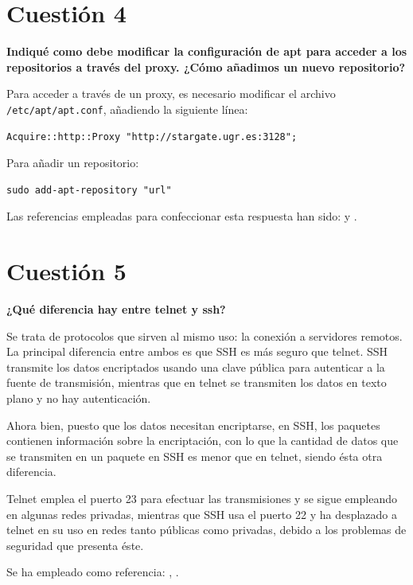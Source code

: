 \documentclass[a4paper,11pt]{article}
\newenvironment{answer}{%
\begin{list}{}{%
}%
\item[]}{\end{list}}
\begin{document}
\section{Cuestión 4}
\textbf{Indiqué como debe modificar la configuración de apt para acceder a los repositorios a través del proxy. ¿Cómo 
añadimos un nuevo repositorio?}
\begin{answer}
  Para acceder a través de un proxy, es necesario modificar el archivo \texttt{/etc/apt/apt.conf},
  añadiendo la siguiente línea:
  \begin{lstlisting}[style=BashInputStyle]
  Acquire::http::Proxy "http://stargate.ugr.es:3128";
  \end{lstlisting}
  Para añadir un repositorio:
  \begin{lstlisting}[style=BashInputStyle]
  sudo add-apt-repository "url"
  \end{lstlisting}
  
  Las referencias empleadas para confeccionar esta respuesta han sido: \cite{aptproxy} y
  \cite{aptrepo}.
\end{answer}

\section{Cuestión 5}
\textbf{¿Qué diferencia hay entre telnet y ssh?}
\begin{answer}
  Se trata de protocolos que sirven al mismo uso: la conexión a servidores remotos.
  La principal diferencia entre ambos es que SSH es más seguro que telnet. SSH transmite
  los datos encriptados usando una clave pública para autenticar a la fuente de transmisión, 
  mientras que en telnet se transmiten los datos en texto plano y no hay autenticación.
  
  Ahora bien, puesto que los datos necesitan encriptarse, en SSH, los paquetes contienen
  información sobre la encriptación, con lo que la cantidad de datos que se transmiten
  en un paquete en SSH es menor que en telnet, siendo ésta otra diferencia.
  
  Telnet emplea el puerto 23 para efectuar las transmisiones y se sigue empleando
  en algunas redes privadas, mientras que SSH usa el puerto 22 y ha desplazado
  a telnet en su uso en redes tanto públicas como privadas, debido a los problemas
  de seguridad que presenta éste.
  
  Se ha empleado como referencia: \cite{sshtelnet}, \cite{linuxssh}.
\end{answer}
\end{document}
